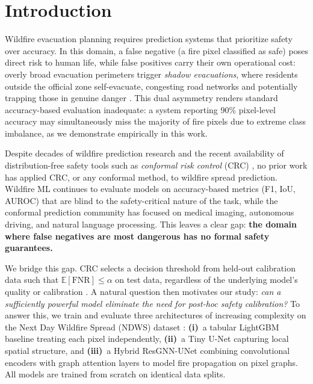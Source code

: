 \documentclass{article}
\begin{document}

\section{Introduction}

Wildfire evacuation planning requires prediction systems that prioritize safety over accuracy.
In this domain, a false negative (a fire pixel classified as safe) poses direct risk to human life, while false positives carry their own operational cost: overly broad evacuation perimeters trigger \emph{shadow evacuations}, where residents outside the official zone self-evacuate, congesting road networks and potentially trapping those in genuine danger \citep{zhao2022evacuation}.
This dual asymmetry renders standard accuracy-based evaluation inadequate: a system reporting 90\% pixel-level accuracy may simultaneously miss the majority of fire pixels due to extreme class imbalance, as we demonstrate empirically in this work.

Despite decades of wildfire prediction research \citep{jain2020review} and the recent availability of distribution-free safety tools such as \emph{conformal risk control} (CRC) \citep{angelopoulos2022conformal}, no prior work has applied CRC, or any conformal method, to wildfire spread prediction.
Wildfire ML continues to evaluate models on accuracy-based metrics (F1, IoU, AUROC) that are blind to the safety-critical nature of the task, while the conformal prediction community has focused on medical imaging, autonomous driving, and natural language processing.
This leaves a clear gap: \textbf{the domain where false negatives are most dangerous has no formal safety guarantees.}

We bridge this gap.
CRC selects a decision threshold from held-out calibration data such that $\mathbb{E}[\mathrm{FNR}] \le \alpha$ on test data, regardless of the underlying model's quality or calibration \citep{angelopoulos2021gentle}.
A natural question then motivates our study: \emph{can a sufficiently powerful model eliminate the need for post-hoc safety calibration?}
To answer this, we train and evaluate three architectures of increasing complexity on the Next Day Wildfire Spread (NDWS) dataset \citep{huot2022next}:
\textbf{(i)}~a tabular LightGBM baseline \citep{ke2017lightgbm} treating each pixel independently,
\textbf{(ii)}~a Tiny U-Net \citep{ronneberger2015unet} capturing local spatial structure, and
\textbf{(iii)}~a Hybrid ResGNN-UNet combining convolutional encoders with graph attention layers \citep{veličković2018graph} to model fire propagation on pixel graphs.
All models are trained from scratch on identical data splits.
\end{document}
